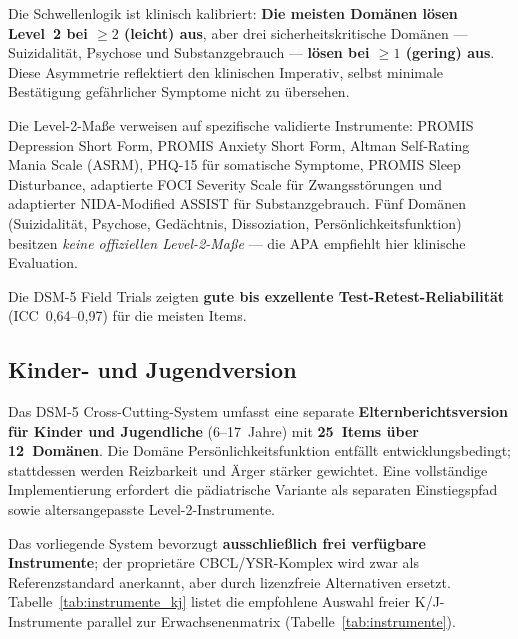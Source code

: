 \documentclass[11pt,a4paper]{article}
\begin{document}
Die Schwellenlogik ist klinisch kalibriert: \textbf{Die meisten Dom\"anen l\"osen Level~2 bei $\geq 2$ (leicht) aus}, aber drei sicherheitskritische Dom\"anen --- Suizidalit\"at, Psychose und Substanzgebrauch --- \textbf{l\"osen bei $\geq 1$ (gering) aus}. Diese Asymmetrie reflektiert den klinischen Imperativ, selbst minimale Best\"atigung gef\"ahrlicher Symptome nicht zu \"ubersehen.

Die Level-2-Ma\ss{}e verweisen auf spezifische validierte Instrumente: PROMIS Depression Short Form, PROMIS Anxiety Short Form, Altman Self-Rating Mania Scale (ASRM), PHQ-15 f\"ur somatische Symptome, PROMIS Sleep Disturbance, adaptierte FOCI Severity Scale f\"ur Zwangsst\"orungen und adaptierter NIDA-Modified ASSIST f\"ur Substanzgebrauch. F\"unf Dom\"anen (Suizidalit\"at, Psychose, Ged\"achtnis, Dissoziation, Pers\"onlichkeitsfunktion) besitzen \textit{keine offiziellen Level-2-Ma\ss{}e} --- die APA empfiehlt hier klinische Evaluation.

Die DSM-5 Field Trials \citep{Narrow2013} zeigten \textbf{gute bis exzellente Test-Retest-Reliabilit\"at} (ICC~0,64--0,97) f\"ur die meisten Items.

\subsection{Kinder- und Jugendversion}
\label{sec:screening_kj}

Das DSM-5 Cross-Cutting-System umfasst eine separate \textbf{Elternberichtsversion f\"ur Kinder und Jugendliche} (6--17~Jahre) mit \textbf{25~Items \"uber 12~Dom\"anen}. Die Dom\"ane \glqq Pers\"onlichkeitsfunktion\grqq{} entf\"allt entwicklungsbedingt; stattdessen werden Reizbarkeit und \"Arger st\"arker gewichtet. Eine vollst\"andige Implementierung erfordert die p\"adiatrische Variante als separaten Einstiegspfad sowie altersangepasste Level-2-Instrumente.

Das vorliegende System bevorzugt \textbf{ausschlie\ss{}lich frei verf\"ugbare Instrumente}; der propriet\"are CBCL/YSR-Komplex \citep{Achenbach2001} wird zwar als Referenzstandard anerkannt, aber durch lizenzfreie Alternativen ersetzt. Tabelle~\ref{tab:instrumente_kj} listet die empfohlene Auswahl freier K/J-Instrumente parallel zur Erwachsenenmatrix (Tabelle~\ref{tab:instrumente}).
\end{document}
